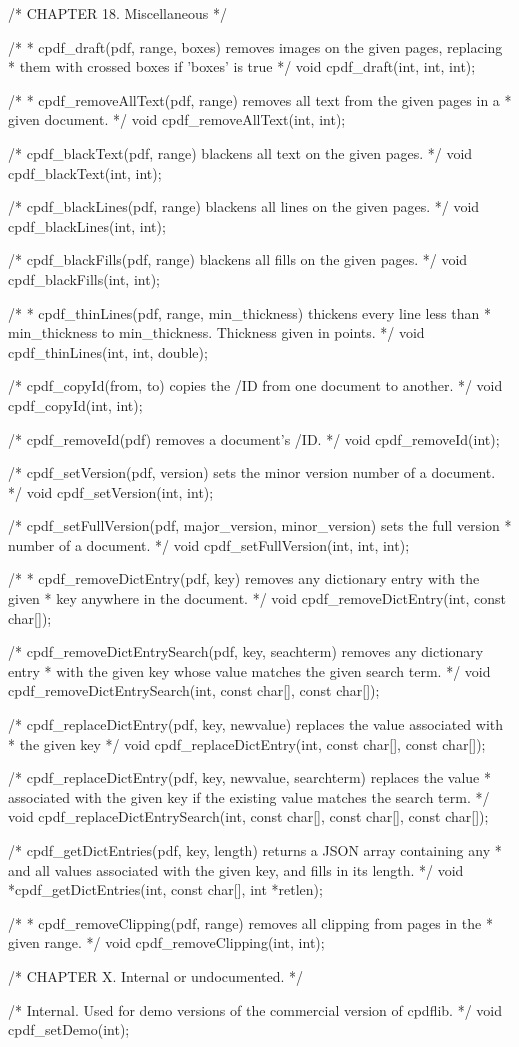 /* CHAPTER 18. Miscellaneous */

/*
 * cpdf_draft(pdf, range, boxes) removes images on the given pages, replacing
 * them with crossed boxes if 'boxes' is true
 */
void cpdf_draft(int, int, int);

/*
 * cpdf_removeAllText(pdf, range) removes all text from the given pages in a
 * given document.
 */
void cpdf_removeAllText(int, int);

/* cpdf_blackText(pdf, range) blackens all text on the given pages. */
void cpdf_blackText(int, int);

/* cpdf_blackLines(pdf, range) blackens all lines on the given pages. */
void cpdf_blackLines(int, int);

/* cpdf_blackFills(pdf, range) blackens all fills on the given pages. */
void cpdf_blackFills(int, int);

/*
 * cpdf_thinLines(pdf, range, min_thickness) thickens every line less than
 * min_thickness to min_thickness. Thickness given in points.
 */
void cpdf_thinLines(int, int, double);

/* cpdf_copyId(from, to) copies the /ID from one document to another. */
void cpdf_copyId(int, int);

/* cpdf_removeId(pdf) removes a document's /ID. */
void cpdf_removeId(int);

/* cpdf_setVersion(pdf, version) sets the minor version number of a document. */
void cpdf_setVersion(int, int);

/* cpdf_setFullVersion(pdf, major_version, minor_version) sets the full version
 * number of a document. */
void cpdf_setFullVersion(int, int, int);

/*
 * cpdf_removeDictEntry(pdf, key) removes any dictionary entry with the given
 * key anywhere in the document.
 */
void cpdf_removeDictEntry(int, const char[]);

/* cpdf_removeDictEntrySearch(pdf, key, seachterm) removes any dictionary entry
 * with the given key whose value matches the given search term. */
void cpdf_removeDictEntrySearch(int, const char[], const char[]);

/* cpdf_replaceDictEntry(pdf, key, newvalue) replaces the value associated with
 * the given key */
void cpdf_replaceDictEntry(int, const char[], const char[]);

/* cpdf_replaceDictEntry(pdf, key, newvalue, searchterm) replaces the value
 * associated with the given key if the existing value matches the search term.
 */
void cpdf_replaceDictEntrySearch(int, const char[], const char[], const char[]);

/* cpdf_getDictEntries(pdf, key, length) returns a JSON array containing any
 * and all values associated with the given key, and fills in its length. */
void *cpdf_getDictEntries(int, const char[], int *retlen);

/*
 * cpdf_removeClipping(pdf, range) removes all clipping from pages in the
 * given range.
 */
void cpdf_removeClipping(int, int);

/* CHAPTER X. Internal or undocumented. */

/* Internal. Used for demo versions of the commercial version of cpdflib. */
void cpdf_setDemo(int);
